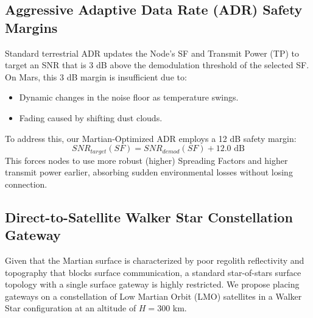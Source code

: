 \documentclass[journal,10pt,doublecolumn]{IEEEtran}
\begin{document}
\subsection{Aggressive Adaptive Data Rate (ADR) Safety Margins}
Standard terrestrial ADR updates the Node's SF and Transmit Power (TP) to target an SNR that is 3 dB above the demodulation threshold of the selected SF. On Mars, this 3 dB margin is insufficient due to:
\begin{itemize}
    \item Dynamic changes in the noise floor as temperature swings.
    \item Fading caused by shifting dust clouds.
\end{itemize}
To address this, our Martian-Optimized ADR employs a 12 dB safety margin:
\begin{equation}
    SNR_{target}(SF) = SNR_{demod}(SF) + 12.0 \text{ dB}
\end{equation}
This forces nodes to use more robust (higher) Spreading Factors and higher transmit power earlier, absorbing sudden environmental losses without losing connection.

\subsection{Direct-to-Satellite Walker Star Constellation Gateway}
Given that the Martian surface is characterized by poor regolith reflectivity and topography that blocks surface communication, a standard star-of-stars surface topology with a single surface gateway is highly restricted. We propose placing gateways on a constellation of Low Martian Orbit (LMO) satellites in a Walker Star configuration at an altitude of $H = 300$ km. 
\end{document}
